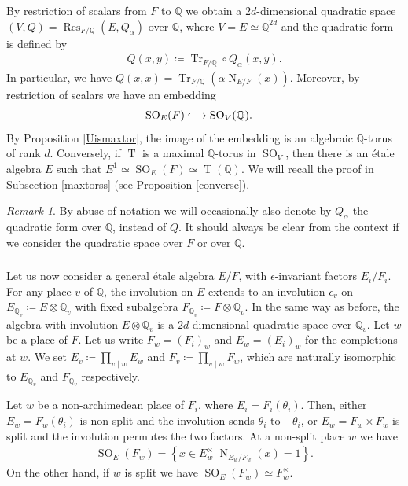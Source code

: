 \documentclass[11pt]{article} %
\newcommand{\8}{\infty}
\newcommand{\Tbf}{\operatorname{T}}
\newcommand{\SO}{\operatorname{SO}}
\newcommand{\Q}{\mathbb{Q}}
\newcommand{\Tr}{\operatorname{Tr}}
\newcommand{\Res}{\operatorname{Res}}
\newcommand{\N}{\operatorname{N}}
\newcommand{\hooklongrightarrow}{\lhook\joinrel\longrightarrow}
\theoremstyle{mytheoremstyle}
\theoremstyle{remark}
\newtheorem{rmk}{Remark}[section]
\numberwithin{equation}{section}
\begin{document}
\subsubsection{} By restriction of scalars from $F$ to $\Q$ we obtain a $2d$-dimensional quadratic space $(V,Q)=\Res_{F/\Q} (E,Q_\alpha)$ over $\Q$, where $V=E \simeq \Q^{2d}$ and the quadratic form is defined by 
\begin{align} \label{quadform}
Q(x,y) \coloneqq \Tr_{F/\Q} \circ Q_\alpha(x,y).
\end{align} In particular, we have $Q(x,x) = \Tr_{F/\Q}(\alpha \N_{E/F}(x))$. Moreover, by restriction of scalars we have an embedding
\begin{align} \label{emb1}
    \SO_E(F) & \hooklongrightarrow \SO_V(\Q).
\end{align}
By Proposition \ref{Uismaxtor}, the image of the embedding is an algebraic $\Q$-torus of rank $d$. Conversely, if $\Tbf$ is a maximal $\Q$-torus in $\SO_V$, then there is an \'etale algebra $E$ such that $E^1 \simeq \SO_{E}(F) \simeq \Tbf(\Q)$. We will recall the proof in Subsection \ref{maxtorss} (see Proposition \ref{converse}).
\begin{rmk}
    By abuse of notation we will occasionally also denote by $Q_\alpha$ the quadratic form over $\Q$, instead of $Q$. It should always be clear from the context if we consider the quadratic space over $F$ or over $\Q$.
\end{rmk}

\subsubsection{} Let us now consider a general \'etale algebra $E/F$, with $\epsilon$-invariant factors $E_i/F_i$. For any place $v$ of $\Q$, the involution on $E$ extends to an involution $\epsilon_v$ on $E_{\Q_v} \coloneqq E \otimes \Q_v$ with fixed subalgebra $F_{\Q_v} \coloneqq F \otimes \Q_v$. In the same way as before, the algebra with involution $E \otimes \Q_v$ is a $2d$-dimensional quadratic space over $\Q_v$. Let $w$ be a place of $F$. Let us write $F_w=(F_i)_w$ and $E_w=(E_i)_w$ for the completions at $w$. We set $E_v \coloneqq \prod_{v \mid w} E_w$ and $F_v\coloneqq \prod_{v \mid w} F_w$, which are naturally isomorphic to $E_{\Q_v}$ and $F_{\Q_v}$ respectively.

Let $w$ be a non-archimedean place of $F_i$, where $E_i=F_i(\theta_i)$. Then, either $E_w=F_w(\theta_i)$ is non-split and the involution sends $\theta_i$ to $-\theta_i$, or $E_w=F_w \times F_w$ is split and the involution permutes the two factors. At a non-split place $w$ we have
\begin{align}
    \SO_E(F_w) = \left \{ \left . x \in E_w^\times \right \vert \N_{E_w/F_w}(x)=1\right\}.
\end{align}
On the other hand, if $w$ is split we have $\SO_E(F_w) \simeq  F_w^\times.
$
\end{document}
